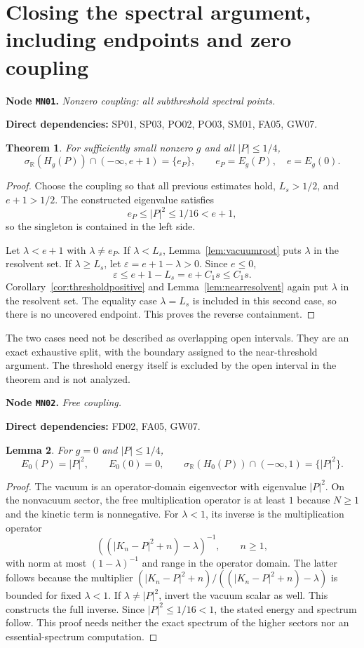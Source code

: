 \documentclass[11pt,a4paper]{article}
\newtheorem{theorem}{Theorem}[section]
\newtheorem{lemma}[theorem]{Lemma}
\theoremstyle{remark}\newtheorem{remark}[theorem]{Remark}
\newcommand{\R}{\mathbb R}\newcommand{\C}{\mathbb C}\newcommand{\N}{\mathbb N}
\newcommand{\abs}[1]{\lvert #1\rvert}\newcommand{\rankone}[2]{\lvert #1\rangle\langle #2\rvert}
\newcommand{\node}[3]{\par\Needspace{6\baselineskip}\smallskip\hypertarget{node:#1}{}\label{nodepage:#1}\noindent\textbf{Node \texttt{#1}.} \textit{#2.}\par\noindent\textbf{Direct dependencies:} #3.\par}
\newcommand{\sigR}{\sigma_{\R}}
\begin{document}
\section{Closing the spectral argument, including endpoints and zero coupling}\label{sec:assembly}
\node{MN01}{Nonzero coupling: all subthreshold spectral points}{SP01, SP03, PO02, PO03, SM01, FA05, GW07}
\begin{theorem}\label{thm:nonzeromain}
For sufficiently small nonzero $g$ and all $\abs P\leq1/4$,
\[
 \sigR(H_g(P))\cap(-\infty,e+1)=\{e_P\},
 \qquad e_P=E_g(P),\quad e=E_g(0).
\]
\end{theorem}
\begin{proof}
Choose the coupling so that all previous estimates hold, $L_s>1/2$, and $e+1>1/2$. The constructed eigenvalue satisfies
\[
 e_P\leq\abs P^2\leq1/16<e+1,
\]
so the singleton is contained in the left side.

Let $\lambda<e+1$ with $\lambda\ne e_P$. If $\lambda<L_s$, Lemma~\ref{lem:vacuumroot} puts $\lambda$ in the resolvent set. If $\lambda\geq L_s$, let $\varepsilon=e+1-\lambda>0$. Since $e\leq0$,
\[
 \varepsilon\leq e+1-L_s=e+C_1s\leq C_1s.
\]
Corollary~\ref{cor:thresholdpositive} and Lemma~\ref{lem:nearresolvent} again put $\lambda$ in the resolvent set. The equality case $\lambda=L_s$ is included in this second case, so there is no uncovered endpoint. This proves the reverse containment.
\end{proof}
The two cases need not be described as overlapping open intervals. They are an exact exhaustive split, with the boundary assigned to the near-threshold argument. The threshold energy itself is excluded by the open interval in the theorem and is not analyzed.

\node{MN02}{Free coupling}{FD02, FA05, GW07}
\begin{lemma}\label{lem:free}
For $g=0$ and $\abs P\leq1/4$,
\[
 E_0(P)=\abs P^2,\qquad E_0(0)=0,\qquad
 \sigR(H_0(P))\cap(-\infty,1)=\{\abs P^2\}.
\]
\end{lemma}
\begin{proof}
The vacuum is an operator-domain eigenvector with eigenvalue $\abs P^2$. On the nonvacuum sector, the free multiplication operator is at least $1$ because $N\geq1$ and the kinetic term is nonnegative. For $\lambda<1$, its inverse is the multiplication operator
\[
 ((\abs{K_n-P}^2+n)-\lambda)^{-1},\qquad n\geq1,
\]
with norm at most $(1-\lambda)^{-1}$ and range in the operator domain. The latter follows because the multiplier $(\abs{K_n-P}^2+n)/((\abs{K_n-P}^2+n)-\lambda)$ is bounded for fixed $\lambda<1$. If $\lambda\ne\abs P^2$, invert the vacuum scalar as well. This constructs the full inverse. Since $\abs P^2\leq1/16<1$, the stated energy and spectrum follow. This proof needs neither the exact spectrum of the higher sectors nor an essential-spectrum computation.
\end{proof}
\end{document}
